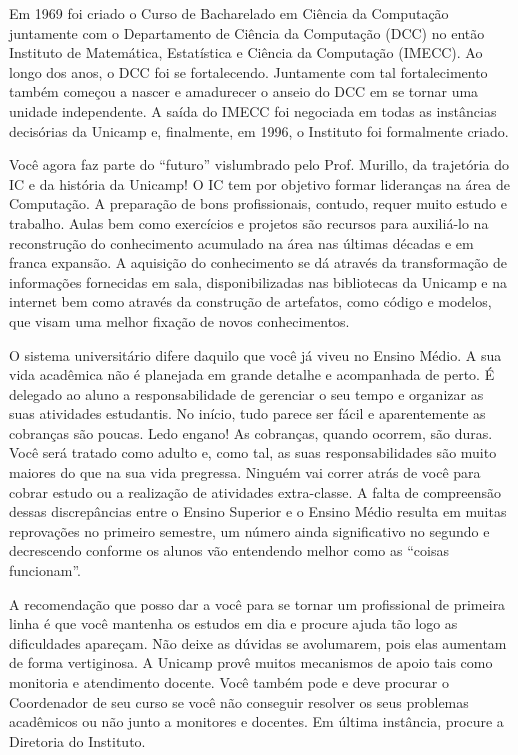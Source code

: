 \documentclass[a4paper,10pt]{article}
\begin{document}
Em 1969 foi criado o Curso de Bacharelado em Ciência da Computação juntamente
com o Departamento de Ciência da Computação (DCC) no então Instituto de
Matemática, Estatística e Ciência da Computação (IMECC). Ao longo dos anos,
o DCC foi se fortalecendo. Juntamente com tal fortalecimento também começou
a nascer e amadurecer o anseio do DCC em se tornar uma unidade independente.
A saída do IMECC foi negociada em todas as instâncias decisórias da Unicamp e,
finalmente, em 1996, o Instituto foi formalmente criado.

Você agora faz parte do “futuro” vislumbrado pelo Prof. Murillo, da trajetória
do IC e da história da Unicamp! O IC tem por objetivo formar lideranças na área
de Computação. A preparação de bons profissionais, contudo, requer muito estudo
e trabalho. Aulas bem como exercícios e projetos são recursos para auxiliá-lo na
reconstrução do conhecimento acumulado na área nas últimas décadas e em franca
expansão. A aquisição do conhecimento se dá através da transformação de
informações fornecidas em sala, disponibilizadas nas bibliotecas da Unicamp e na
internet bem como através da construção de artefatos, como código e modelos, que
visam uma melhor fixação de novos conhecimentos.

O sistema universitário difere daquilo que você já viveu no Ensino Médio. A sua
vida acadêmica não é planejada em grande detalhe e acompanhada de perto.
É delegado ao aluno a responsabilidade de gerenciar o seu tempo e organizar as
suas atividades estudantis. No início, tudo parece ser fácil e aparentemente as
cobranças são poucas. Ledo engano! As cobranças, quando ocorrem, são duras. Você
será tratado como adulto e, como tal, as suas responsabilidades são muito
maiores do que na sua vida pregressa. Ninguém vai correr atrás de você para
cobrar estudo ou a realização de atividades extra-classe. A falta de compreensão
dessas discrepâncias entre o Ensino Superior e o Ensino Médio resulta em muitas
reprovações no primeiro semestre, um número ainda significativo no segundo
e decrescendo conforme os alunos vão entendendo melhor como as “coisas
funcionam”.

A recomendação que posso dar a você para se tornar um profissional de primeira
linha é que você mantenha os estudos em dia e procure ajuda tão logo as
dificuldades apareçam. Não deixe as dúvidas se avolumarem, pois elas aumentam de
forma vertiginosa. A Unicamp provê muitos mecanismos de apoio tais como
monitoria e atendimento docente. Você também pode e deve procurar o Coordenador
de seu curso se você não conseguir resolver os seus problemas acadêmicos ou não
junto a monitores e docentes. Em última instância, procure a Diretoria do
Instituto.
\end{document}

